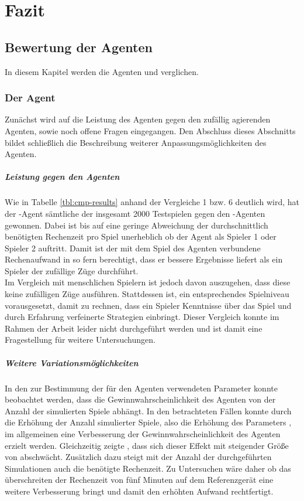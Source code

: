 \chapter{Fazit}
\label{Fazit}

\section{Bewertung der Agenten}
In diesem Kapitel werden die Agenten  und  verglichen. 
\subsection{Der Agent }
Zunächst wird auf die Leistung des Agenten  gegen den zufällig agierenden Agenten, sowie noch offene Fragen eingegangen. Den Abschluss dieses Abschnitts bildet schließlich die Beschreibung weiterer Anpassungsmöglichkeiten des Agenten.  
\paragraph{Leistung gegen den Agenten }
Wie in Tabelle \ref{tbl:cmp-results} anhand der Vergleiche 1 bzw. 6 deutlich wird, hat der -Agent sämtliche der insgesamt 2000 Testspielen gegen den -Agenten gewonnen. Dabei ist bis auf eine geringe Abweichung der durchschnittlich benötigten Rechenzeit pro Spiel unerheblich ob der Agent als Spieler 1 oder Spieler 2 auftritt. Damit ist der mit dem Spiel des Agenten verbundene Rechenaufwand in so fern berechtigt, dass er bessere Ergebnisse liefert als ein Spieler der zufällige Züge durchführt.
\\Im Vergleich mit menschlichen Spielern ist jedoch davon auszugehen, dass diese keine zufälligen Züge ausführen. Stattdessen ist, ein entsprechendes Spielniveau vorausgesetzt, damit zu rechnen, dass ein Spieler Kenntnisse über das Spiel und durch Erfahrung verfeinerte Strategien einbringt. Dieser Vergleich konnte im Rahmen der Arbeit leider nicht durchgeführt werden und ist damit eine Fragestellung für weitere Untersuchungen.  
\paragraph{Weitere Variationsmöglichkeiten}
In den zur Bestimmung der für den Agenten verwendeten Parameter konnte beobachtet werden, dass die Gewinnwahrscheinlichkeit des Agenten von der Anzahl der simulierten Spiele abhängt. In den betrachteten Fällen konnte durch die Erhöhung der Anzahl simulierter Spiele, also die Erhöhung des Parameters , im allgemeinen eine Verbesserung der Gewinnwahrscheinlichkeit des Agenten erzielt werden. Gleichzeitig zeigte \cite{nijssen_2007}, dass sich dieser Effekt mit steigender Größe von  abschwächt. Zusätzlich dazu steigt mit der Anzahl der durchgeführten Simulationen auch die benötigte Rechenzeit. Zu Untersuchen wäre daher ob das überschreiten der Rechenzeit von fünf Minuten auf dem Referenzgerät eine weitere Verbesserung bringt und damit den erhöhten Aufwand rechtfertigt.

